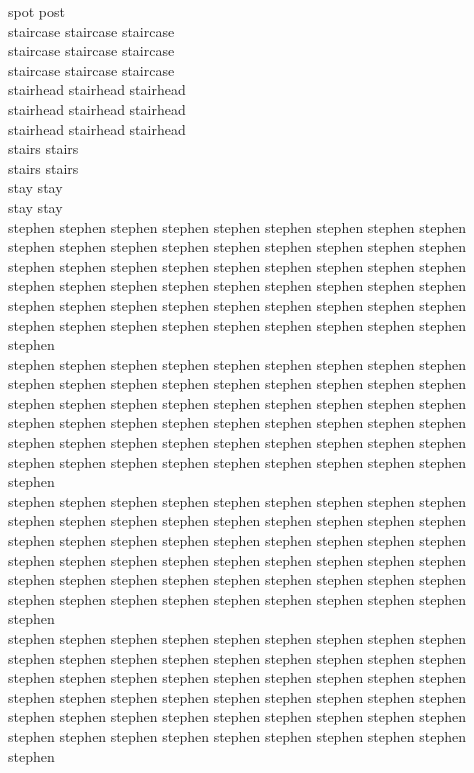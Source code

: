 spot post\\
staircase staircase staircase\\
staircase staircase staircase\\
staircase staircase staircase\\
stairhead stairhead stairhead\\
stairhead stairhead stairhead\\
stairhead stairhead stairhead\\
stairs stairs\\
stairs stairs\\
stay stay\\
stay stay\\
stephen stephen stephen stephen stephen stephen stephen stephen stephen stephen stephen stephen stephen stephen stephen stephen stephen stephen stephen stephen stephen stephen stephen stephen stephen stephen stephen stephen stephen stephen stephen stephen stephen stephen stephen stephen stephen stephen stephen stephen stephen stephen stephen stephen stephen stephen stephen stephen stephen stephen stephen stephen stephen stephen stephen\\
stephen stephen stephen stephen stephen stephen stephen stephen stephen stephen stephen stephen stephen stephen stephen stephen stephen stephen stephen stephen stephen stephen stephen stephen stephen stephen stephen stephen stephen stephen stephen stephen stephen stephen stephen stephen stephen stephen stephen stephen stephen stephen stephen stephen stephen stephen stephen stephen stephen stephen stephen stephen stephen stephen stephen\\
stephen stephen stephen stephen stephen stephen stephen stephen stephen stephen stephen stephen stephen stephen stephen stephen stephen stephen stephen stephen stephen stephen stephen stephen stephen stephen stephen stephen stephen stephen stephen stephen stephen stephen stephen stephen stephen stephen stephen stephen stephen stephen stephen stephen stephen stephen stephen stephen stephen stephen stephen stephen stephen stephen stephen\\
stephen stephen stephen stephen stephen stephen stephen stephen stephen stephen stephen stephen stephen stephen stephen stephen stephen stephen stephen stephen stephen stephen stephen stephen stephen stephen stephen stephen stephen stephen stephen stephen stephen stephen stephen stephen stephen stephen stephen stephen stephen stephen stephen stephen stephen stephen stephen stephen stephen stephen stephen stephen stephen stephen stephen\\
